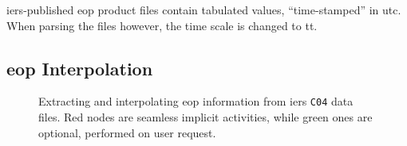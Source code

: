 \begin{warning}
\gls{iers}-published \gls{eop} product files contain tabulated values, ``time-stamped'' 
in \gls{utc}. When parsing the files however, the time scale is changed to \gls{tt}.
\end{warning}

\subsection{\gls{eop} Interpolation}\label{ssec:eop-interpolation}

\begin{figure}
  \centering
  
  \caption{Extracting and interpolating \gls{eop} information from \gls{iers} 
    \texttt{C04} data files. Red nodes are seamless implicit activities, while 
    green ones are optional, performed on user request.}
  \label{fig:handling-eop}
\end{figure}

